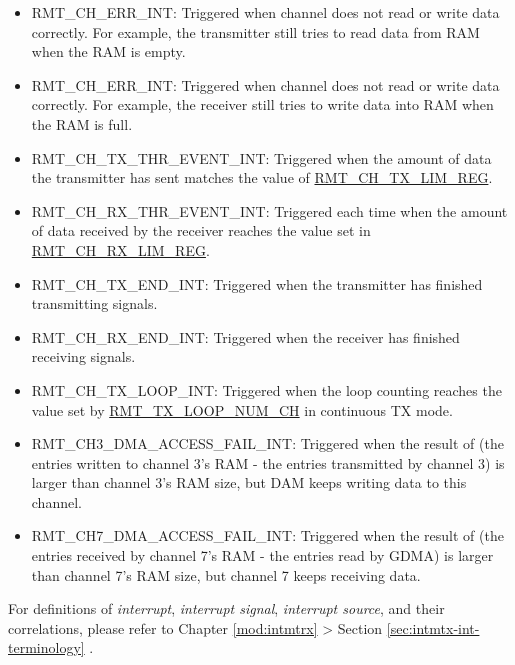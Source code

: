 \documentclass[main\_\_EN.tex]{subfiles}
\begin{document}
\begin{itemize}
\item \label{int:RMTCHNERRINT}RMT\_CH\_ERR\_INT: Triggered when channel  does not read or write data correctly.  For example, the transmitter still tries to read data from RAM when the RAM is empty.
\item \label{int:RMTCHMERRINT}RMT\_CH\_ERR\_INT: Triggered when channel  does not read or write data correctly. For example, the receiver still tries to write data into RAM when the RAM is full.
\item \label{int:RMTCHNTXTHREVENTINT}RMT\_CH\_TX\_THR\_EVENT\_INT: Triggered when the amount of data the transmitter has sent matches the value of  \hyperref[regdesc:RMTCHNTXLIMREG]{RMT\_CH\_TX\_LIM\_REG}.
\item \label{int:RMTCHMRXTHREVENTINT}RMT\_CH\_RX\_THR\_EVENT\_INT: Triggered each time when the amount of data received by the receiver reaches the value set in \hyperref[fielddesc:RMTCHMRXLIMREG]{RMT\_CH\_RX\_LIM\_REG}.
\item \label{int:RMTCHNTXENDINT}RMT\_CH\_TX\_END\_INT: Triggered when the transmitter has finished transmitting signals.
\item \label{int:RMTCHMRXENDINT}RMT\_CH\_RX\_END\_INT: Triggered when the receiver has finished receiving signals.
\item \label{int:RMTCHNTXLOOPINT}RMT\_CH\_TX\_LOOP\_INT: Triggered when the loop counting reaches the value set by  \hyperref[fielddesc:RMTTXLOOPNUMCHN]{RMT\_TX\_LOOP\_NUM\_CH} in continuous TX mode.
\item \label{int:RMTCHNDMAACCESSFAILINT}RMT\_CH3\_DMA\_ACCESS\_FAIL\_INT: Triggered when the result of (the entries written to channel 3's RAM - the entries transmitted by channel 3) is larger than channel 3's RAM size, but DAM keeps writing data to this channel.
\item \label{int:RMTCHMDMAACCESSFAILINT}RMT\_CH7\_DMA\_ACCESS\_FAIL\_INT: Triggered when the result of (the entries received by channel 7's RAM - the entries read by GDMA) is larger than channel 7's RAM size, but channel 7 keeps receiving data.
\end{itemize}

\begin{tiplisting}
For definitions of \textit{interrupt}, \textit{interrupt signal}, \textit{interrupt source}, and their correlations, please refer to Chapter \ref{mod:intmtrx} \textit{} > Section \ref{sec:intmtx-int-terminology} \textit{}.
\end{tiplisting}
\end{document}
